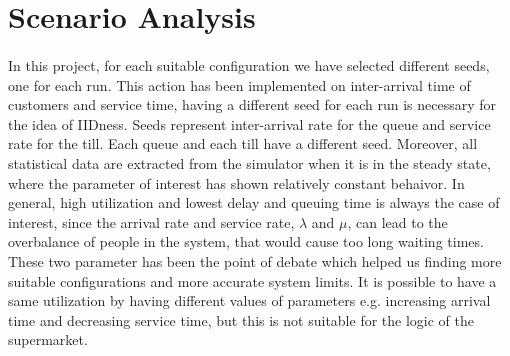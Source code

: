 \section{Scenario Analysis}
\paragraph{}
In this project, for each suitable configuration we have selected different seeds, one for each run. This action has been implemented on inter-arrival time of customers and service time, having a different seed for each run is necessary for the idea of IIDness. Seeds represent inter-arrival rate for the queue and service rate for the till. Each queue and each till have a different seed. Moreover, all statistical data are extracted from the simulator when it is in the steady state, where the parameter of interest has shown relatively constant behaivor. In general, high utilization and lowest delay and queuing time is always the case of interest, since the arrival rate and service rate, $\lambda$ and $\mu$, can lead to the overbalance of people in the system, that would cause too long waiting times. These two parameter has been the point of debate which helped us finding more suitable configurations and more accurate system limits. It is possible to have a same utilization by having different values of parameters e.g. increasing arrival time and decreasing service time, but this is not suitable for the logic of the supermarket.    





%
%
